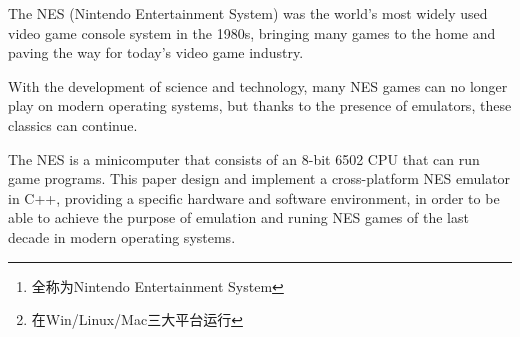 \documentclass[a4paper]{ltxdoc}
\begin{document}





\begin{abstract}
	NES\footnote{全称为Nintendo Entertainment System}(任天堂娱乐系统)在20世纪80年代是世界上使用最广泛的电子游戏终端，其将许多游戏带入了家庭，并为当今电子游戏产业铺平了道路。

	随着科技的发展，许多NES游戏已经无法在当今系统上游玩，然而归功于模拟器的存在，使得这些经典能够延续下去。

	NES是一个由8位6502 CPU组成的微型计算机，能够有条不絮地运行游戏程序。本课题设计并用C++实现一个跨平台\footnote{在Win/Linux/Mac三大平台运行}的NES模拟系统，提供一个具体的软、硬件环境，以达到在现代操作系统中能够模拟并运行上个年代的NES游戏的目的。

\end{abstract}

\begin{abstractEn}
	The NES (Nintendo Entertainment System) was the world's most widely used video game console system in the 1980s, bringing many games to the home and paving the way for today's video game industry.

	With the development of science and technology, many NES games can no longer play on modern operating systems, but thanks to the presence of emulators, these classics can continue.

	The NES is a minicomputer that consists of an 8-bit 6502 CPU that can run game programs. This paper design and implement a cross-platform NES emulator in C++, providing a specific hardware and software environment, in order to be able to achieve the purpose of emulation and runing NES games of the last decade in modern operating systems.
\end{abstractEn}

{
\setlength{\cftfignumwidth}{3.5em}
\setlength{\cfttabnumwidth}{3.5em}
\clearpage
\tableofcontents
{}

\clearpage
\listoffigures

\clearpage
\listoftables

}

\fancyhead{}
\pagestyle{fancy}
\end{document}
